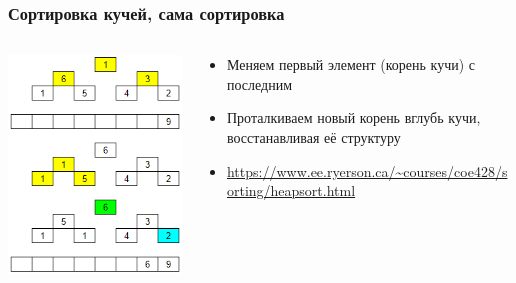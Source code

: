 \documentclass[xetex,mathserif,serif]{beamer}
\begin{document}
	\begin{frame}
		\frametitle{Сортировка кучей, сама сортировка}
		\begin{columns}
			\begin{column}{0.4\textwidth}
				\includegraphics[width=\textwidth]{heapSort.png}
			\end{column}
			\begin{column}{0.6\textwidth}
				\begin{itemize}
					\item Меняем первый элемент (корень кучи) с последним
					\item Проталкиваем новый корень вглубь кучи, восстанавливая её структуру
					\item \url{https://www.ee.ryerson.ca/~courses/coe428/sorting/heapsort.html}
				\end{itemize}
			\end{column}
		\end{columns}
	\end{frame}
\end{document}
